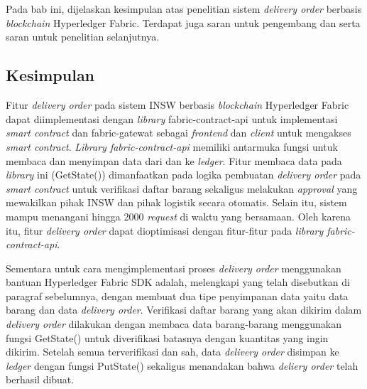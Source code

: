 \chapter{\kesimpulan}
\label{bab:6}
Pada bab ini, dijelaskan kesimpulan atas penelitian sistem \textit{delivery order} berbasis \textit{blockchain} Hyperledger Fabric. Terdapat juga saran untuk pengembang dan serta saran untuk penelitian selanjutnya.


\section{Kesimpulan}
\label{sec:kesimpulan}

Fitur \textit{delivery order} pada sistem INSW berbasis \textit{blockchain} Hyperledger Fabric dapat diimplementasi dengan \textit{library} fabric-contract-api untuk implementasi \textit{smart contract} dan fabric-gatewat sebagai \textit{frontend} dan \textit{client} untuk mengakses \textit{smart contract}. \textit{Library fabric-contract-api} memiliki antarmuka fungsi untuk membaca dan menyimpan data dari dan ke \textit{ledger}. Fitur membaca data pada \textit{library} ini (GetState()) dimanfaatkan pada logika pembuatan \textit{delivery order} pada \textit{smart contract} untuk verifikasi daftar barang sekaligus melakukan \textit{approval} yang mewakilkan pihak INSW dan pihak logistik secara otomatis. Selain itu, sistem mampu menangani hingga 2000 \textit{request} di waktu yang bersamaan. Oleh karena itu, fitur \textit{delivery order} dapat dioptimisasi dengan fitur-fitur pada \textit{library fabric-contract-api}.

Sementara untuk cara mengimplementasi proses \textit{delivery order} menggunakan bantuan Hyperledger Fabric SDK adalah, melengkapi yang telah disebutkan di paragraf sebelumnya, dengan membuat dua tipe penyimpanan data yaitu data barang dan data \textit{delivery order}. Verifikasi daftar barang yang akan dikirim dalam \textit{delivery order} dilakukan dengan membaca data barang-barang menggunakan fungsi GetState()  untuk diverifikasi batasnya dengan kuantitas yang ingin dikirim. Setelah semua terverifikasi dan sah, data \textit{delivery order} disimpan ke \textit{ledger} dengan fungsi PutState() sekaligus menandakan bahwa \textit{deliery order} telah berhasil dibuat.

